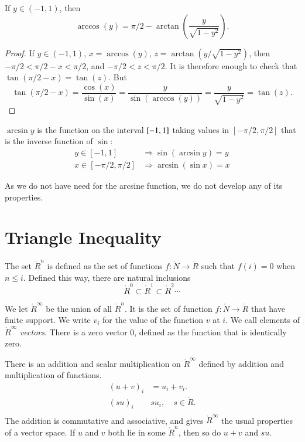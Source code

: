 \begin{lemma}\label{lemma:arccos-arctan}  If $y\in (-1,1)$, then
    $$\arccos(y) = \pi/2 - \arctan(\frac{y}{ \sqrt{1-y^2}}).$$
\end{lemma}

\begin{proof} If $y\in (-1,1)$,  $x = \arccos(y)$, 
$z = \arctan(y/\sqrt{1-y^2})$, then
    $-\pi/2 < \pi/2 - x < \pi/2$, and $-\pi/2 < z < \pi/2$.  It is
    therefore enough to check that
        $\tan(\pi/2 - x) = \tan(z)$.
    But
        $$\tan(\pi/2-x) = \frac{\cos(x)}{\sin(x)} = \frac{y}{
        \sin(\arccos(y))} = \frac{y}{ \sqrt{1-y^2}} = \tan(z).$$
\end{proof}

\begin{definition}\label{def:arcsin}
$\arcsin y$ is the function on the interval $[
-1,1]$ taking values in $[-\pi/2,\pi/2]$ that is the
inverse function of $\sin$:
    $$\begin{array}{lll}
        y\in [-1,1] &\Rightarrow \sin(\arcsin y) = y\\
        x\in[-\pi/2,\pi/2] &\Rightarrow \arcsin(\sin x) = x
    \end{array}$$
\end{definition}

As we do not have need for the arcsine function, we do not develop
any of its properties.





\section{Triangle Inequality}

The set $\ring{R}^n$ is defined as the set of functions
$f:\ring{N}\to\ring{R}$ such that $f(i) = 0$ when $n\le i$. Defined
this way, there are natural inclusions
    $$\ring{R}^0 \subset \ring{R}^1 \subset \ring{R}^2 \cdots$$

We let $\ring{R}^\infty$ be the union of all $\ring{R}^n$.  It is
the set of function $f:\ring{N}\to\ring{R}$ that have finite
support.  We write $v_i$ for the value of the function $v$ at $i$.
We call elements of $\ring{R}^\infty$ {\it vectors}.  There is a
zero vector $0$, defined as the function that is identically zero.

There is an addition and scalar multiplication on $\ring{R}^\infty$
defined by addition and multiplication of functions.
    $$\begin{array}{lll}
    (u + v)_i &= u_i + v_i.\\
    (s u)_i & s u_i,\quad s\in\ring{R}.\\
    \end{array}
    $$
The addition is commutative and associative, and gives
$\ring{R}^\infty$ the usual properties of a vector space. If $u$ and
$v$ both lie in some $\ring{R}^n$, then so do $u+v$ and $s u$.

